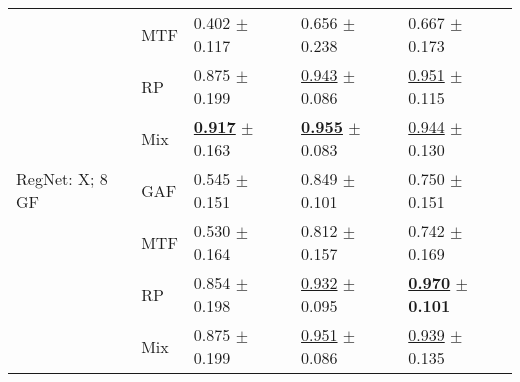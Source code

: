 \begin{tabular}[t]{lllll}
 & MTF & \textcolor[rgb]{1.0000000000,0.0000000000,0}{0.402} $\pm$ \textcolor[rgb]{0.4173650062,0.5000000000,0}{0.117} & \textcolor[rgb]{1.0000000000,0.0000000000,0}{0.656} $\pm$ \textcolor[rgb]{0.9883576976,0.0116423024,0}{0.238} & \textcolor[rgb]{0.9424083770,0.0575916230,0}{0.667} $\pm$ \textcolor[rgb]{0.3509958762,0.5000000000,0}{0.173} \\
 & RP & \textcolor[rgb]{0.0808823529,0.5000000000,0}{0.875} $\pm$ \textcolor[rgb]{0.7127864450,0.2872135550,0}{0.199} & \underline{\textcolor[rgb]{0.0398406375,0.5000000000,0}{0.943}} $\pm$ \textcolor[rgb]{0.1408376023,0.5000000000,0}{0.086} & \underline{\textcolor[rgb]{0.0569371728,0.5000000000,0}{0.951}} $\pm$ \textcolor[rgb]{0.0702311536,0.5000000000,0}{0.115} \\
 & Mix & \underline{\textbf{\textcolor[rgb]{0.0000000000,0.5000000000,0}{0.917}}} $\pm$ \textcolor[rgb]{0.5819876952,0.4180123048,0}{0.163} & \underline{\textbf{\textcolor[rgb]{0.0000000000,0.5000000000,0}{0.955}}} $\pm$ \textcolor[rgb]{0.1234823448,0.5000000000,0}{0.083} & \underline{\textcolor[rgb]{0.0785340314,0.5000000000,0}{0.944}} $\pm$ \textcolor[rgb]{0.1425478198,0.5000000000,0}{0.130} \\
RegNet: X; 8 GF & GAF & \textcolor[rgb]{0.7205882353,0.2794117647,0}{0.545} $\pm$ \textcolor[rgb]{0.5388159061,0.4611840939,0}{0.151} & \textcolor[rgb]{0.3532536521,0.5000000000,0}{0.849} $\pm$ \textcolor[rgb]{0.2248426669,0.5000000000,0}{0.101} & \textcolor[rgb]{0.6832460733,0.3167539267,0}{0.750} $\pm$ \textcolor[rgb]{0.2449321979,0.5000000000,0}{0.151} \\
 & MTF & \textcolor[rgb]{0.7500000000,0.2500000000,0}{0.530} $\pm$ \textcolor[rgb]{0.5847524980,0.4152475020,0}{0.164} & \textcolor[rgb]{0.4780876494,0.5000000000,0}{0.812} $\pm$ \textcolor[rgb]{0.5338881645,0.4661118355,0}{0.157} & \textcolor[rgb]{0.7091623037,0.2908376963,0}{0.742} $\pm$ \textcolor[rgb]{0.3325754726,0.5000000000,0}{0.169} \\
 & RP & \textcolor[rgb]{0.1213235294,0.5000000000,0}{0.854} $\pm$ \textcolor[rgb]{0.7085309655,0.2914690345,0}{0.198} & \underline{\textcolor[rgb]{0.0746106483,0.5000000000,0}{0.932}} $\pm$ \textcolor[rgb]{0.1902677072,0.5000000000,0}{0.095} & \underline{\textbf{\textcolor[rgb]{0.0000000000,0.5000000000,0}{0.970}}} $\pm$ \textbf{\textcolor[rgb]{0.0000000000,0.5000000000,0}{0.101}} \\
 & Mix & \textcolor[rgb]{0.0808823529,0.5000000000,0}{0.875} $\pm$ \textcolor[rgb]{0.7127864450,0.2872135550,0}{0.199} & \underline{\textcolor[rgb]{0.0137631293,0.5000000000,0}{0.951}} $\pm$ \textcolor[rgb]{0.1389089621,0.5000000000,0}{0.086} & \underline{\textcolor[rgb]{0.0942408377,0.5000000000,0}{0.939}} $\pm$ \textcolor[rgb]{0.1673576575,0.5000000000,0}{0.135} \\

\end{tabular}
